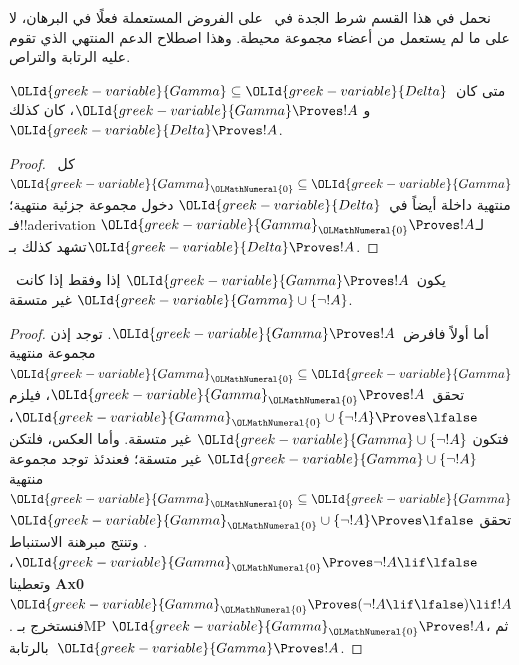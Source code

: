 \documentclass[../../../include/open-logic-section]{subfiles}
\begin{document}
      {}
      {}


\begin{editorial}
نحمل في هذا القسم شرط الجدة في~\QR{} على الفروض المستعملة فعلًا في البرهان،
لا على ما لم يستعمل من أعضاء مجموعة محيطة. وهذا اصطلاح الدعم المنتهي الذي
تقوم عليه الرتابة والتراص.
\end{editorial}

\begin{prop}[الرتابة] متى كان~${\OLId{greek-variable}{Gamma}} \subseteq {\OLId{greek-variable}{Delta}}$ و
${\OLId{greek-variable}{Gamma}} \Proves !A$، كان كذلك~${\OLId{greek-variable}{Delta}} \Proves !A$.
\end{prop}

\begin{proof}
كل~${\OLId{greek-variable}{Gamma}}_{\OLMathNumeral{0}} \subseteq {\OLId{greek-variable}{Gamma}}$ منتهية داخلة أيضاً في~${\OLId{greek-variable}{Delta}}$ دخول
مجموعة جزئية منتهية؛ فـ!!a{derivation} لـ${\OLId{greek-variable}{Gamma}}_{\OLMathNumeral{0}} \Proves !A$ تشهد
كذلك بـ${\OLId{greek-variable}{Delta}} \Proves !A$.
\end{proof}

\begin{prop}
يكون~${\OLId{greek-variable}{Gamma}} \Proves !A$ إذا وفقط إذا كانت~${\OLId{greek-variable}{Gamma}}\cup \{\lnot!A \}$
غير متسقة.
\end{prop}

\begin{proof}
أما أولاً فافرض~${\OLId{greek-variable}{Gamma}} \Proves !A$. توجد إذن مجموعة منتهية
${\OLId{greek-variable}{Gamma}}_{\OLMathNumeral{0}} \subseteq {\OLId{greek-variable}{Gamma}}$ تحقق~${\OLId{greek-variable}{Gamma}}_{\OLMathNumeral{0}} \Proves !A$، فيلزم
${\OLId{greek-variable}{Gamma}}_{\OLMathNumeral{0}} \cup \{\lnot !A\} \Proves \lfalse$، فتكون
${\OLId{greek-variable}{Gamma}} \cup \{\lnot !A\}$ غير متسقة. وأما العكس، فلتكن
${\OLId{greek-variable}{Gamma}} \cup \{\lnot !A\}$ غير متسقة؛ فعندئذ توجد مجموعة منتهية
${\OLId{greek-variable}{Gamma}}_{\OLMathNumeral{0}} \subseteq {\OLId{greek-variable}{Gamma}}$ تحقق
${\OLId{greek-variable}{Gamma}}_{\OLMathNumeral{0}} \cup \{\lnot !A\} \Proves \lfalse$. وتنتج مبرهنة الاستنباط
${\OLId{greek-variable}{Gamma}}_{\OLMathNumeral{0}} \Proves \lnot !A \lif \lfalse$، وتعطينا \textbf{Ax0}
${\OLId{greek-variable}{Gamma}}_{\OLMathNumeral{0}} \Proves (\lnot !A \lif \lfalse) \lif !A$. فنستخرج بـMP
${\OLId{greek-variable}{Gamma}}_{\OLMathNumeral{0}} \Proves !A$، ثم بالرتابة~${\OLId{greek-variable}{Gamma}} \Proves !A$.
\end{proof}
\end{document}
